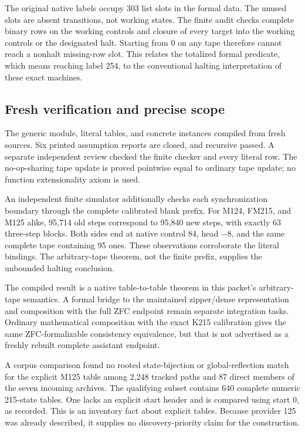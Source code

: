 The original native labels occupy 303 list slots in the formal data. The
unused slots are absent transitions, not working states. The finite audit
checks complete binary rows on the working controls and closure of every
target into the working controls or the designated halt. Starting from 0
on any tape therefore cannot reach a nonhalt missing-row slot. This relates
the totalized formal predicate, which means reaching label 254, to the
conventional halting interpretation of these exact machines.

\subsection{Fresh verification and precise scope}

The generic module, literal tables, and concrete instances compiled from
fresh sources. Six printed assumption reports are closed, and recursive
 passed. A separate independent review
checked the finite checker and every literal row. The no-op-sharing tape
update is proved pointwise equal to ordinary tape update; no function
extensionality axiom is used.

An independent finite simulator additionally checks each synchronization
boundary through the complete calibrated blank prefix. For M124, FM215,
and M125 alike, 95,714 old steps correspond to 95,840 new steps, with exactly
63 three-step blocks. Both sides end at native control 84, head $-8$, and
the same complete tape containing 95 ones. These observations corroborate
the literal bindings. The arbitrary-tape theorem, not the finite prefix,
supplies the unbounded halting conclusion.

The compiled result is a native table-to-table theorem in this packet's
arbitrary-tape semantics. A formal bridge to the maintained zipper/dense
representation and composition with the full ZFC endpoint remain separate
integration tasks. Ordinary mathematical composition with the exact K215
calibration gives the same ZFC-formalizable consistency equivalence, but
that is not advertised as a freshly rebuilt complete assistant endpoint.

A corpus comparison found no rooted state-bijection or global-reflection
match for the explicit M125 table among 2,248 tracked  paths and
87 direct  members of the seven incoming archives. The qualifying
subset contains 640 complete numeric 215-state tables. One lacks an explicit
start header and is compared using start 0, as recorded. This is an inventory
fact about explicit tables. Because provider 125 was already described,
it supplies no discovery-priority claim for the construction.

